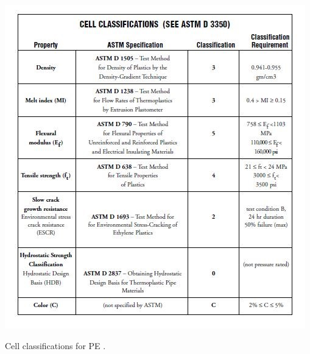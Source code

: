 \documentclass[12pt]{report}
\begin{document}
\begin{table}[H]
    \centering
    \includegraphics[width=\textwidth]{cell_classifications_for_pe.jpg}
    \caption{Cell classifications for PE \cite{meola2005cross}.}
\end{table}
\end{document}
